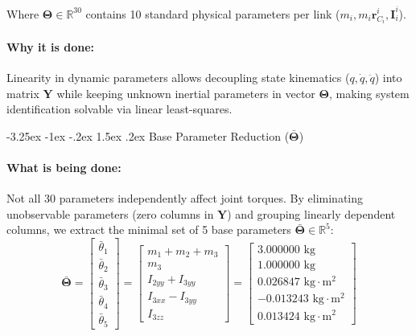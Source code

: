 \documentclass[11pt, a4paper]{article}
\makeatletter
\renewcommand{\subsection}{\@startsection{subsection}{2}{\z@}%
    {-3.25ex \@plus -1ex \@minus -.2ex}%
    {1.5ex \@plus .2ex}%
    {\normalfont\large\bfseries\color{brandaccent}}}
\makeatother
\begin{document}
Where $\boldsymbol{\Theta} \in \mathbb{R}^{30}$ contains 10 standard physical parameters per link ($m_i, m_i \mathbf{r}_{C_i}^i, \mathbf{I}_{i}^i$).

\paragraph{Why it is done:}
Linearity in dynamic parameters allows decoupling state kinematics ($q, \dot{q}, \ddot{q}$) into matrix $\mathbf{Y}$ while keeping unknown inertial parameters in vector $\boldsymbol{\Theta}$, making system identification solvable via linear least-squares.

\subsection{Base Parameter Reduction (\texorpdfstring{$\bar{\boldsymbol{\Theta}}$}{theta\_base})}
\paragraph{What is being done:}
Not all 30 parameters independently affect joint torques. By eliminating unobservable parameters (zero columns in $\mathbf{Y}$) and grouping linearly dependent columns, we extract the minimal set of 5 base parameters $\bar{\boldsymbol{\Theta}} \in \mathbb{R}^5$:
\begin{equation}
    \bar{\boldsymbol{\Theta}} = \begin{bmatrix}
    \bar{\theta}_1 \\[0.2em]
    \bar{\theta}_2 \\[0.2em]
    \bar{\theta}_3 \\[0.2em]
    \bar{\theta}_4 \\[0.2em]
    \bar{\theta}_5
    \end{bmatrix} = \begin{bmatrix}
    m_1 + m_2 + m_3 \\[0.2em]
    m_3 \\[0.2em]
    I_{2yy} + I_{3yy} \\[0.2em]
    I_{3xx} - I_{3yy} \\[0.2em]
    I_{3zz}
    \end{bmatrix} = \begin{bmatrix}
    3.000000 \text{ kg} \\[0.2em]
    1.000000 \text{ kg} \\[0.2em]
    0.026847 \text{ kg}\cdot\text{m}^2 \\[0.2em]
    -0.013243 \text{ kg}\cdot\text{m}^2 \\[0.2em]
    0.013424 \text{ kg}\cdot\text{m}^2
    \end{bmatrix}
\end{equation}
\end{document}
